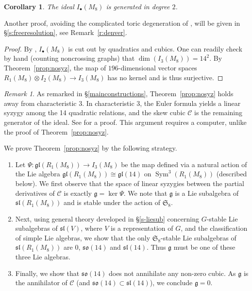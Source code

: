\documentclass{amsart}
\newtheorem{corollary}[theorem]{Corollary}
\theoremstyle{definition}
\theoremstyle{remark}
\newtheorem{remark}[theorem]{\it Remark}
\DeclareMathOperator{\Sym}{Sym}
\def\SS{\mathfrak{S}}
\def\cubic{\mathcal{C}}
\let\mf\mathfrak
\begin{document}
\begin{corollary}
\label{prop:i2-i3}\label{generation}
The ideal $I_{\bullet}(M_8)$ is generated in degree $2$.
\end{corollary}

Another proof, avoiding the complicated toric degeneration of \cite{hmsv2}, will be given in \S \ref{s:freeresolution},
see Remark~\ref{r:denver}.

\begin{proof}
By \cite[Thm.~5.1]{hmsv2}, $I_{\bullet}(M_8)$ is cut out by quadratics and cubics.  One can readily check by hand
(counting noncrossing graphs) that $\dim (I_3(M_8)) = 14^2$.  By Theorem~\ref{prop:nosyz}, the map of $196$-dimensional
vector spaces $R_1(M_8) \otimes I_2(M_8) \to I_3(M_8)$ has no kernel and is thus surjective.
\end{proof}

\begin{remark}
 As remarked in \S \ref{mainconstructions}, Theorem~\ref{prop:nosyz} holds away from characteristic $3$.  In
characteristic $3$, the Euler formula yields a linear syzygy among the 14 quadratic relations, and the skew cubic
$\cubic$ is the remaining generator of the ideal.  See \cite[Thm 1.2
and  \S 9]{hmsve} for a proof.  
This argument requires a computer, unlike the proof of Theorem~\ref{prop:nosyz}.
\end{remark}

We prove Theorem~\ref{prop:nosyz} by the following strategy.

\begin{enumerate}
\item[(a)] Let $\Psi:\mf{gl}(R_1(M_8)) \to I_3(M_8)$ be the map defined via a natural action of the Lie algebra
$\mf{gl}(R_1(M_8)) \cong \mf{gl}(14)$ on $\Sym^3(R_1(M_8))$ (described below).  We first observe that the space of
linear syzygies between the partial derivatives of $\cubic$ is exactly $\mf{g}=\ker{\Psi}$.  We note that $\mf{g}$ is a
Lie subalgebra of $\mf{sl}(R_1(M_8))$ and is stable under the action of $\SS_8$.
\item[(b)] Next, using general theory developed in \S \ref{s-liesub} concerning $G$-stable Lie subalgebras of
$\mf{sl}(V)$, where $V$ is a representation of $G$, and the classification of simple Lie algebras, we show that the
only $\SS_8$-stable Lie subalgebras of $\mf{sl}(R_1(M_8))$ are 0, $\mf{so}(14)$ and $\mf{sl}(14)$.  Thus $\mf{g}$ must
be one of these three Lie algebras.
\item[(c)] Finally, we show that $\mf{so}(14)$ does not annihilate any non-zero cubic.  As $\mf{g}$ is the annihilator
of $\cubic$ (and $\mf{so}(14) \subset \mf{sl}(14)$), we conclude $\mf{g}=0$.
\end{enumerate}
\end{document}
